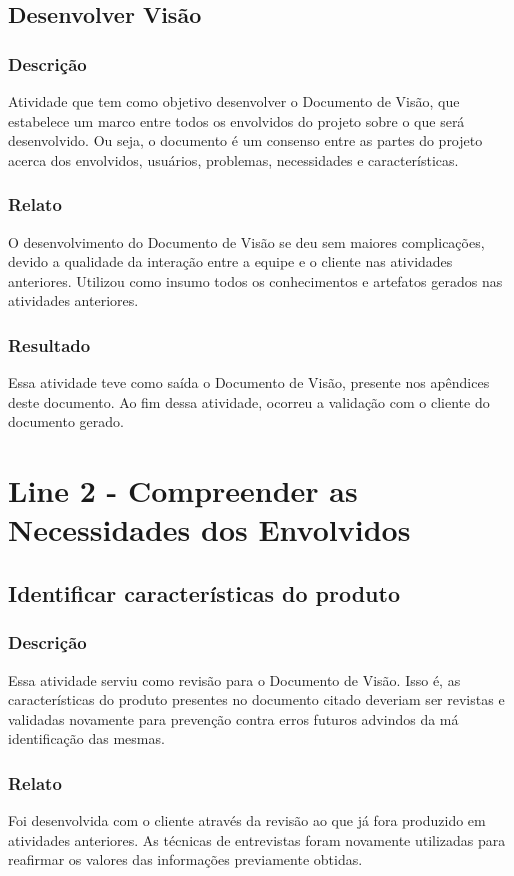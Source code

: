 \subsection{Desenvolver Visão}
\subsubsection{Descrição}
  Atividade que tem como objetivo desenvolver o Documento de Visão, que estabelece um marco entre todos os envolvidos do projeto sobre o que será desenvolvido. Ou seja, o documento é um consenso entre as partes do projeto acerca dos envolvidos, usuários, problemas, necessidades e características.

\subsubsection{Relato}
  O desenvolvimento do Documento de Visão se deu sem maiores complicações, devido a qualidade da interação entre a equipe e o cliente nas atividades anteriores. Utilizou como insumo todos os conhecimentos e artefatos gerados nas atividades anteriores.

\subsubsection{Resultado}
  Essa atividade teve como saída o Documento de Visão, presente nos apêndices deste documento. Ao fim dessa atividade, ocorreu a validação com o cliente do documento gerado.

\section{Line 2 - Compreender as Necessidades dos Envolvidos}
\subsection{Identificar características do produto}
\subsubsection{Descrição}
Essa atividade serviu como revisão para o Documento de Visão. Isso é, as características do produto presentes no documento citado deveriam ser revistas e validadas novamente para prevenção contra erros futuros advindos da má identificação das mesmas.

\subsubsection{Relato}
Foi desenvolvida com o cliente através da revisão ao que já fora produzido em atividades anteriores. As técnicas de entrevistas foram novamente utilizadas para reafirmar os valores das informações previamente obtidas.

